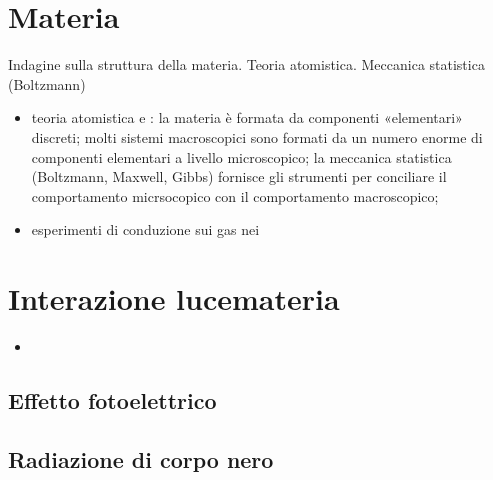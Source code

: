 \documentclass[letterpaper,10pt,italian]{jupyterBook}
\begin{document}
\section{Materia}
\label{\detokenize{ch/modern/intro-experiments:materia}}\label{\detokenize{ch/modern/intro-experiments:physics-hs-modern-intro-experiences-matter}}
\sphinxAtStartPar
Indagine sulla struttura della materia. Teoria atomistica. Meccanica statistica (Boltzmann)
\begin{itemize}
\item {} 
\sphinxAtStartPar
teoria atomistica e : la materia è formata da componenti «elementari» discreti; molti sistemi macroscopici sono formati da un numero enorme di componenti elementari a livello microscopico; la meccanica statistica (Boltzmann, Maxwell, Gibbs) fornisce gli strumenti per conciliare il comportamento micrsocopico con il comportamento macroscopico;

\item {} 
\sphinxAtStartPar
esperimenti di conduzione sui gas nei 

\end{itemize}


\section{Interazione luce\sphinxhyphen{}materia}
\label{\detokenize{ch/modern/intro-experiments:interazione-luce-materia}}\label{\detokenize{ch/modern/intro-experiments:physics-hs-modern-intro-experiences-light-matter}}\begin{itemize}
\item {} 
\sphinxAtStartPar
{} 

\end{itemize}


\subsection{Effetto fotoelettrico}
\label{\detokenize{ch/modern/intro-experiments:effetto-fotoelettrico}}\label{\detokenize{ch/modern/intro-experiments:physics-hs-modern-intro-experiences-photoelectric}}

\subsection{Radiazione di corpo nero}
\label{\detokenize{ch/modern/intro-experiments:radiazione-di-corpo-nero}}\label{\detokenize{ch/modern/intro-experiments:physics-hs-modern-intro-experiences-blackbody}}
\end{document}
